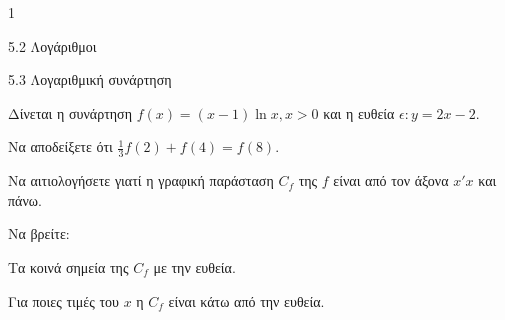 \begin{ylh}{1}
\item 5.2 Λογάριθμοι
\item 5.3 Λογαριθμική συνάρτηση
\end{ylh}
Δίνεται η συνάρτηση $f(x) = (x - 1) \ln x, x > 0$ και η ευθεία $\epsilon: y = 2x - 2$.
\begin{alist}
\item Να αποδείξετε ότι $\frac{1}{3} f(2) + f(4) = f(8)$.
\item Να αιτιολογήσετε γιατί η γραφική παράσταση $C_f$ της $f$ είναι από τον άξονα $x'x$ και πάνω.
\item Να βρείτε:
\end{alist}
\begin{alist}
\item
  Τα κοινά σημεία της $C_f$ με την ευθεία.
\end{alist}
\begin{alist}
\item
  Για ποιες τιμές του $x$ η $C_f$ είναι κάτω από την ευθεία.
\end{alist}

